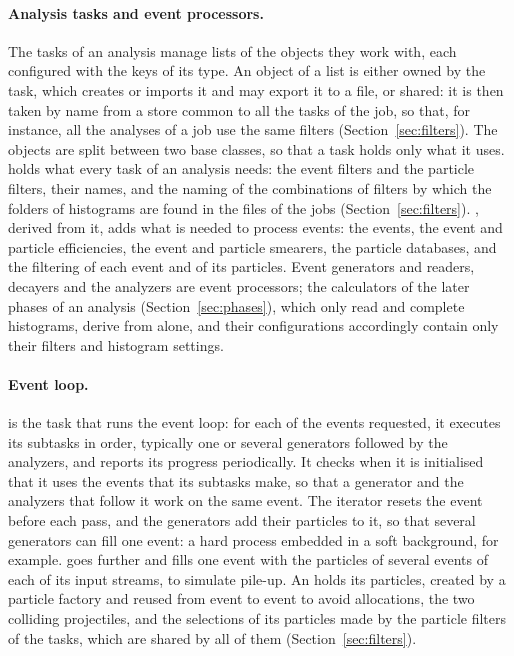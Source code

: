 \paragraph{Analysis tasks and event processors.}
The tasks of an analysis manage lists of the objects they work with, each configured with the keys of its type. An
object of a list is either owned by the task, which creates or imports it and may export it to a file, or shared: it
is then taken by name from a store common to all the tasks of the job, so that, for instance, all the analyses of a
job use the same filters (Section~\ref{sec:filters}). The objects are split between two base classes, so that a task
holds only what it uses.  holds what every task of an analysis needs: the event filters and the
particle filters, their names, and the naming of the combinations of filters by which the folders of histograms are
found in the files of the jobs (Section~\ref{sec:filters}). , derived from it, adds what is needed
to process events: the events, the event and particle efficiencies, the event and particle smearers, the particle
databases, and the filtering of each event and of its particles. Event generators and readers, decayers and the
analyzers are event processors; the calculators of the later phases of an analysis (Section~\ref{sec:phases}), which
only read and complete histograms, derive from  alone, and their configurations accordingly
contain only their filters and histogram settings.

\paragraph{Event loop.}
 is the task that runs the event loop: for each of the events requested, it executes its subtasks in order, typically one or several generators followed by the analyzers, and reports its progress periodically. It checks when it is initialised that it uses the events that its subtasks make, so that a generator and the analyzers that follow it work on the same event. The iterator resets the event before each pass, and the generators add their particles to it, so that several generators can fill one event: a hard process embedded in a soft background, for example.  goes further and fills one event with the particles of several events of each of its input streams, to simulate pile-up. An  holds its particles, created by a particle factory and reused from event to event to avoid allocations, the two colliding projectiles, and the selections of its particles made by the particle filters of the tasks, which are shared by all of them (Section~\ref{sec:filters}).

